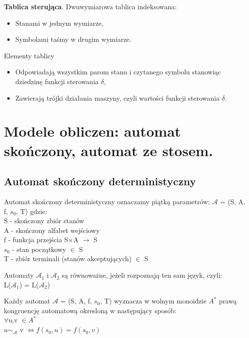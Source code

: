 \documentclass[main.tex]{subfiles}
\begin{document}
    \begin{definition}
        \textbf{Tablica sterująca}. Dwuwymiarowa tablica indeksowana:
        \begin{itemize}
            \item Stanami w jednym wymiarze,
            \item Symbolami taśmy w drugim wymiarze.
        \end{itemize}
        Elementy tablicy
        \begin{itemize}
            \item Odpowiadają wszystkim parom stanu i czytanego symbolu stanowiąc dziedzinę
            funkcji sterowania $\delta$,
            \item Zawierają trójki działania maszyny, czyli wartości funkcji sterowania $\delta$.
        \end{itemize}
    \end{definition}

    \newpage

    \section{Modele obliczen: automat skończony, automat ze stosem.}
    \subsection{Automat skończony deterministyczny}
    \begin{definition}
        Automat skończony deterministyczny oznaczamy piątką parametrów: $\mathcal{A}$ = (S, A, f, $s_{0}$, T) gdzie: \\
        S - skończony zbiór stanów \\
        A - skończony alfabet wejściowy \\
        f - funkcja przejścia S$\times$A $\rightarrow$ S \\
        $s_{0}$ - stan początkowy $\in$ S\\
        T - zbiór terminali (stanów akceptujących) $\in$ S
    \end{definition}

    \begin{definition}
        Automaty $\mathcal{A}_{1}$ i  $\mathcal{A}_{2}$ są równoważne, jeżeli rozpoznają ten sam język, czyli: \\
        L($\mathcal{A}_{1}$) = L($\mathcal{A}_{2}$)
    \end{definition}

    \begin{definition}
        Każdy automat $\mathcal{A}$ = (S, A, f, $s_{0}$, T) wyznacza w wolnym monoidzie $A^{*}$ prawą kongruencję automatową okresloną w następujący sposób: \\
        $\forall$u,v $\in A^{*}$ \\
        $u \sim_\mathcal{A}$ v $\Leftrightarrow f(s_{0}, u) = f(s_{0}, v)$
    \end{definition}
\end{document}
